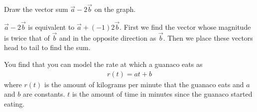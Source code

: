 \question
Draw the vector sum $\vec a - 2\vec b$ on the graph.


\begin{finalanswer}
\end{finalanswer}

\begin{solution}
$\vec a-2\vec b$ is equivalent to $\vec a+(-1)2\vec b$. First we find the vector whose magnitude is twice that of $\vec b$ and in the opposite direction as $\vec b$. Then we place these vectors head to tail to find the sum. 

\end{solution}

\question You find that you can model the rate at which a guanaco eats as
\begin{align*}
r(t)=at+b
\end{align*}
where $r(t)$ is the amount of kilograms per minute that the guanaco eats and $a$ and $b$ are constants. $t$ is the amount of time in minutes since the guanaco started eating.


